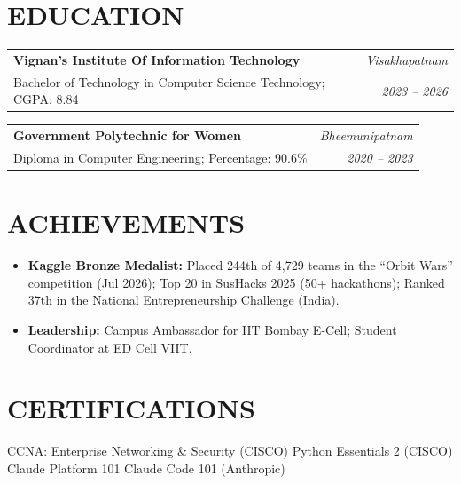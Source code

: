 \documentclass[a4paper,9.5pt]{extarticle}
\makeatletter
\newcommand{\resumeSubheading}[4]{
  \vspace{1.8pt}\nopagebreak[3]
  \begin{tabular*}{1.0\textwidth}[t]{l@{\extracolsep{\fill}}r}
    \textbf{#1} & \textit{\small #2} \\[-1.5pt]
    {\small #3} & \textit{\small #4}
  \end{tabular*}\nopagebreak[4]
}
\makeatother
\begin{document}
\section{EDUCATION}
\resumeSubheading
  {Vignan's Institute Of Information Technology}{Visakhapatnam}
  {Bachelor of Technology in Computer Science Technology; CGPA: 8.84}{2023 -- 2026}
\resumeSubheading
  {Government Polytechnic for Women}{Bheemunipatnam}
  {Diploma in Computer Engineering; Percentage: 90.6\%}{2020 -- 2023}
\section{ACHIEVEMENTS}
\begin{itemize}[leftmargin=1.2em, itemsep=0.3pt, parsep=0pt, topsep=0.8pt, partopsep=0pt, label=\textbullet]
  \item \textbf{Kaggle Bronze Medalist:} Placed 244th of 4,729 teams in the \textquotedblleft{}Orbit Wars\textquotedblright{} competition (Jul 2026); Top 20 in SusHacks 2025 (50+ hackathons); Ranked 37th in the National Entrepreneurship Challenge (India).
  \item \textbf{Leadership:} Campus Ambassador for IIT Bombay E-Cell; Student Coordinator at ED Cell VIIT.
\end{itemize}
\section{CERTIFICATIONS}
{\small CCNA: Enterprise Networking \& Security (CISCO) \enspace\textbar\enspace Python Essentials 2 (CISCO) \enspace\textbar\enspace Claude Platform 101 \enspace\textbar\enspace Claude Code 101 (Anthropic)\par}
\end{document}
